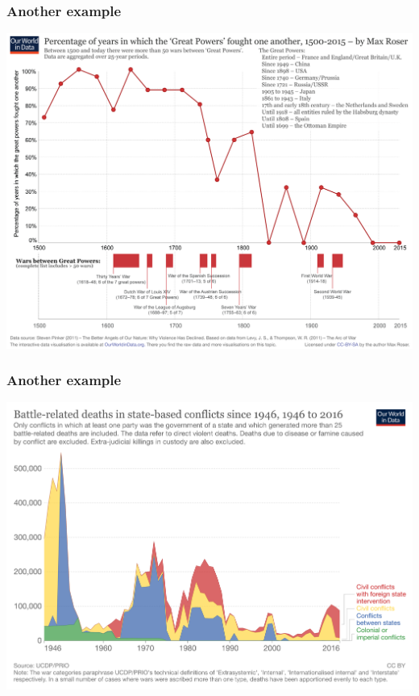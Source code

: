 \documentclass[aspectratio=43]{beamer}
\begin{document}
\begin{frame}
\frametitle{Another example}
\centering

\includegraphics[width = \textwidth]{../img/declineofwar}

\end{frame}

\begin{frame}
\frametitle{Another example}
\centering

\includegraphics[width = \textwidth]{../img/battledeaths}

\end{frame}
\end{document}
